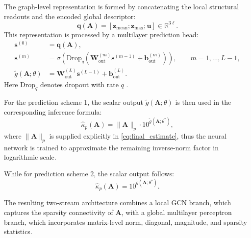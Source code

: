 \documentclass[11pt,a4paper]{article}
\theoremstyle{plain}
\theoremstyle{definition}
\theoremstyle{remark}
\begin{document}
The graph-level representation is formed by concatenating the local structural readouts and the encoded global descriptor:
\begin{equation}
\mathbf{q}(\mathbf{A})
=
\left[
\mathbf{z}_{\mathrm{mean}};
\mathbf{z}_{\max};
\mathbf{u}
\right]
\in\mathbb{R}^{3\ell}.
\label{eq:combined_representation}
\end{equation}
This representation is processed by a multilayer prediction head:
\begin{equation}
\begin{aligned}
\mathbf{s}^{(0)}
&=
\mathbf{q}(\mathbf{A}),\\
\mathbf{s}^{(m)}
&=
\sigma\left(
\mathrm{Drop}_q
\left(
\mathbf{W}_{\mathrm{out}}^{(m)}
\mathbf{s}^{(m-1)}
+
\mathbf{b}_{\mathrm{out}}^{(m)}
\right)
\right),
\qquad
m=1,\ldots,L-1,\\
\tilde{g}(\mathbf{A};\theta)
&=
\mathbf{W}_{\mathrm{out}}^{(L)}
\mathbf{s}^{(L-1)}
+
\mathbf{b}_{\mathrm{out}}^{(L)}.
\end{aligned}
\label{eq:gnn_predictor_general}
\end{equation}
Here $\mathrm{Drop}_q$ denotes dropout with rate $q$ \cite{srivastava2014dropout}. 


For the prediction scheme 1, the scalar output $\tilde{g}(\mathbf{A};\theta)$ is then used in the corresponding inference formula:
\begin{equation*}
\hat{\kappa}_p(\mathbf{A})
=
\|\mathbf{A}\|_p
\cdot
10^{\tilde{g}(\mathbf{A};\theta^*)},
\label{eq:final_estimate}
\end{equation*}
where $\|\mathbf{A}\|_p$ is supplied explicitly in \eqref{eq:final_estimate}, thus the neural network is trained to approximate the remaining inverse-norm factor in logarithmic scale.

While for prediction scheme 2, the scalar output follows:
\begin{equation*}
\hat{\kappa}_p(\mathbf{A})
= 
10^{\tilde{g}(\mathbf{A};\theta^*)}.
\end{equation*}


The resulting two-stream architecture combines a local GCN branch, which captures the sparsity connectivity of $\mathbf{A}$, with a global multilayer perceptron branch, which incorporates matrix-level norm, diagonal, magnitude, and sparsity statistics.  



\end{document}
